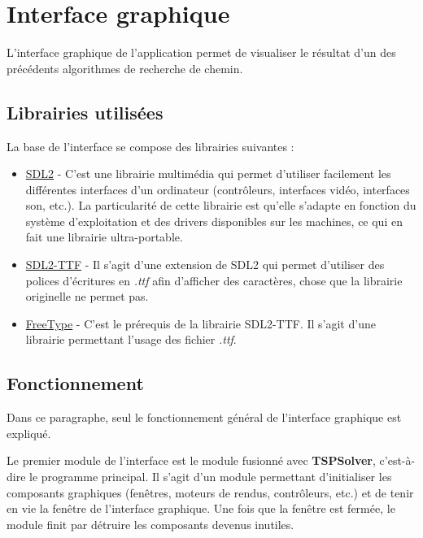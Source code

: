 \chapter{Interface graphique}

L'interface graphique de l'application permet de visualiser le résultat d'un des précédents algorithmes de recherche de chemin. 

\section{Librairies utilisées}

La base de l'interface se compose des librairies suivantes : 
\begin{itemize}
	\item \href{http://www.libsdl.org/download-2.0.php}{SDL2} - C'est une librairie multimédia qui permet d'utiliser facilement les différentes interfaces d'un ordinateur (contrôleurs, interfaces vidéo, interfaces son, etc.). La particularité de cette librairie est qu'elle s'adapte en fonction du système d'exploitation et des drivers disponibles sur les machines, ce qui en fait une librairie ultra-portable.
	\item \href{http://www.libsdl.org/projects/SDL_ttf/}{SDL2-TTF} - Il s'agit d'une extension de SDL2 qui permet d'utiliser des polices d'écritures en \textit{.ttf} afin d'afficher des caractères, chose que la librairie originelle ne permet pas.
	\item \href{http://www.freetype.org/index.html}{FreeType} - C'est le prérequis de la librairie SDL2-TTF. Il s'agit d'une librairie permettant l'usage des fichier \textit{.ttf}.
\end{itemize} 

\section{Fonctionnement}

Dans ce paragraphe, seul le fonctionnement général de l'interface graphique est expliqué.

\par\bigskip
Le premier module de l'interface est le module fusionné avec \textbf{TSPSolver}, c'est-à-dire le programme principal. Il s'agit d'un module permettant d'initialiser les composants graphiques (fenêtres, moteurs de rendus, contrôleurs, etc.) et de tenir en vie la fenêtre de l'interface graphique. Une fois que la fenêtre est fermée, le module finit par détruire les composants devenus inutiles.

